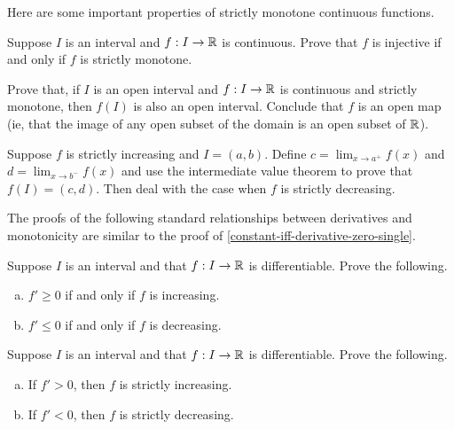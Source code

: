 Here are some important properties of strictly monotone continuous functions.

\begin{exercise} \label{strictly-monotone-iff-injective}
	Suppose $I$ is an interval and $f : I \to \mathbb{R}$ is continuous. Prove that $f$ is injective if and only if $f$ is strictly monotone. 
\end{exercise}

\begin{exercise} \label{strictly-monotone-implies-open}
	Prove that, if $I$ is an open interval and $f : I \to \mathbb{R}$ is continuous and strictly monotone, then $f(I)$ is also an open interval. Conclude that $f$ is an open map (ie, that the image of any open subset of the domain is an open subset of $\mathbb{R}$).
	\begin{hint}
		Suppose $f$ is strictly increasing and $I = (a, b)$. Define $c = \lim_{x \to a^+} f(x)$ and $d = \lim_{x \to b^-} f(x)$ and use the intermediate value theorem to prove that $f(I) = (c, d)$. Then deal with the case when $f$ is strictly decreasing. 
	\end{hint}
\end{exercise}

The proofs of the following standard relationships between derivatives and monotonicity are similar to the proof of \cref{constant-iff-derivative-zero-single}.

\begin{exercise} \label{monotone-derivative} 
	Suppose $I$ is an interval and that $f : I \to \mathbb{R}$ is differentiable. Prove the following. 
	\begin{enumerate}[(a)]
		\item $f' \geq 0$ if and only if $f$ is increasing. 
		\item $f' \leq 0$ if and only if $f$ is decreasing.
	\end{enumerate}
\end{exercise}

\begin{exercise} \label{strictly-monotone-derivative} 
	Suppose $I$ is an interval and that $f : I \to \mathbb{R}$ is differentiable. Prove the following. 
	\begin{enumerate}[(a)]
		\item If $f' > 0$, then $f$ is strictly increasing. 
		\item If $f' < 0$, then $f$ is strictly decreasing. 
	\end{enumerate} 
\end{exercise}

